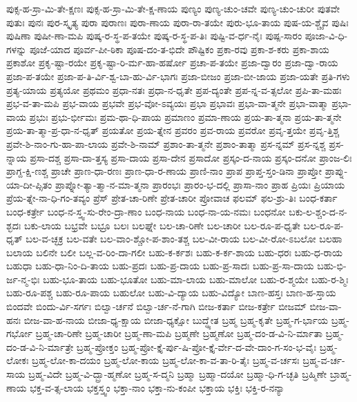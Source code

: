 {ಪುಕ್ಸ-ಹ-ಸ್ರಾ-ಮಿ-ತೇ-ಕ್ಷಣಃ
ಪುಕ್ಸ-ಹ-ಸ್ರಾ-ಮಿ-ತೇ-ಕ್ಷ-ಣಾಯ
ಪುಣ್ಯಂ
ಪುಣ್ಯ-ಚುಂ-ಚವೇ
ಪುಣ್ಯ-ಚುಂ-ಚುರೀ
ಪುತವೇ
ಪುತುಃ
ಪುನಃ
ಪುರ-ಸ್ಕೃತ್ಯ
ಪುರಾ
ಪುರಾಣಃ
ಪುರಾ-ಣಾಯ
ಪುರಾ-ರಾ-ತಯೇ
ಪುರು-ಭೂ-ತಾಯ
ಪುಷ-ಯ-ಶ್ಚೈವ
ಪುಷಿಃ
ಪುಷಿಣಾ
ಪುಷೀ-ಣಾ-ಮಪಿ
ಪುಷ್ಕ-ರ-ಸ್ಥ-ಪ-ತಯೇ
ಪುಷ್ಕ-ರ-ಸ್ಥ-ಪ-ತಿಃ
ಪುಷ್ಟಿ-ವ-ರ್ಧ-ನೈಃ
ಪುಷ್ಪ-ಸಾರಂ
ಪೂಜಾ-ವಿ-ಧಿ-ಗಳನ್ನು
ಪೂಜೆ-ಯಾದ
ಪೂರ್ವ-ಪೀ-ಠಿಕಾ
ಪೂಷ-ದಂ-ತ-ಭಿದೇ
ಪೌಷ್ಟಿಕಂ
ಪ್ರಕಾ-ರವು
ಪ್ರಕಾ-ಶ-ಕರು
ಪ್ರಕಾ-ಶಾಯ
ಪ್ರಕಾಶೋ
ಪ್ರಕೃ-ಷ್ಟಾ-ರಯೇ
ಪ್ರಕೃ-ಷ್ಟಾ-ರಿ-ರ್ಮ-ಹಾ-ಹರ್ಷೋ
ಪ್ರಚಾ-ಪ-ತಯೇ
ಪ್ರಜಾ-ದ್ವಾರಂ
ಪ್ರಜಾ-ದ್ವಾ-ರಾಯ
ಪ್ರಜಾ-ಪ-ತಯೇ
ಪ್ರಜಾ-ಪ-ತಿ-ರ್ವಿ-ಶ್ವ-ಬಾ-ಹು-ರ್ವಿ-ಭಾಗಃ
ಪ್ರಜಾ-ಬೀಜಂ
ಪ್ರಜಾ-ಬೀ-ಜಾಯ
ಪ್ರಜಾ-ಯತೇ
ಪ್ರತಿ-ಗಳು
ಪ್ರತ್ಯ-ಯಾಯ
ಪ್ರತ್ಯಯೋ
ಪ್ರಥಮಂ
ಪ್ರಧಾ-ನತಃ
ಪ್ರಧಾ-ನ-ಧೃತೇ
ಪ್ರಪ-ದ್ಯಂತೇ
ಪ್ರಪ-ನ್ನ-ವ-ತ್ಸಲೋ
ಪ್ರಪಿ-ತಾ-ಮಹಃ
ಪ್ರಭ-ವ-ತಾ-ಮಪಿ
ಪ್ರಭ-ವಾಯ
ಪ್ರಭವೇ
ಪ್ರಭ-ವೋ-ಽವ್ಯಯಃ
ಪ್ರಭಾ
ಪ್ರಭಾವಃ
ಪ್ರಭಾ-ವಾ-ತ್ಮನೇ
ಪ್ರಭಾ-ವಾತ್ಮಾ
ಪ್ರಭಾ-ವಾಯ
ಪ್ರಭುಃ
ಪ್ರಭು-ರ್ಭೀಮಃ
ಪ್ರಮ-ಥಾ-ಧಿ-ಪಾಯ
ಪ್ರಮಾಣಂ
ಪ್ರಮಾ-ಣಾಯ
ಪ್ರಯ-ತಾ-ತ್ಮನಾ
ಪ್ರಯ-ತಾ-ತ್ಮನೇ
ಪ್ರಯ-ತಾ-ತ್ಮಾ-ಪ್ರ-ಧಾ-ನ-ಧೃತ್
ಪ್ರಯತೋ
ಪ್ರಯ-ತ್ನೇನ
ಪ್ರವರಂ
ಪ್ರವ-ರಾಯ
ಪ್ರವರೋ
ಪ್ರವೃ-ತ್ತಯೇ
ಪ್ರವೃ-ತ್ತಿಶ್ಚ
ಪ್ರವೇ-ಶಿ-ನಾಂ-ಗು-ಹಾ-ಪಾ-ಲಾಯ
ಪ್ರವೇ-ಶಿ-ನಾಮ್
ಪ್ರಶಾಂ-ತಾ-ತ್ಮನೇ
ಪ್ರಶಾಂ-ತಾತ್ಮಾ
ಪ್ರಸ-ನ್ನಮ್
ಪ್ರಸ-ನ್ನಶ್ಚ
ಪ್ರಸ-ನ್ನಾಯ
ಪ್ರಸಾ-ದಶ್ಚ
ಪ್ರಸಾ-ದಾ-ತ್ತಸ್ಯ
ಪ್ರಸಾ-ದಾಯ
ಪ್ರಸಾ-ದೇನ
ಪ್ರಸಾದೋ
ಪ್ರಸ್ಕಂ-ದ-ನಾಯ
ಪ್ರಸ್ಕಂ-ದನೋ
ಪ್ರಾಂಜ-ಲಿಃ
ಪ್ರಾಗ್ದ-ಕ್ಷಿ-ಣಶ್ಚ
ಪ್ರಾಚೇ
ಪ್ರಾಣ-ಧಾ-ರಣಃ
ಪ್ರಾಣ-ಧಾ-ರ-ಣಾಯ
ಪ್ರಾಣಿ-ನಾಂ
ಪ್ರಾಪ
ಪ್ರಾಪ್ತ-ಸ್ತಂ-ಡಿನಾ
ಪ್ರಾಪ್ತೋ
ಪ್ರಾಪ್ನು-ಯಾ-ದೀ-ಪ್ಸಿತಂ
ಪ್ರಾಪ್ನೋ-ತ್ಯಾ-ತ್ಮಾ-ನ-ಮಾ-ತ್ಮನಾ
ಪ್ರಾರಂಭಃ
ಪ್ರಾರಂ-ಭ-ದಲ್ಲಿ
ಪ್ರಾಸಾ-ನಾಂ
ಪ್ರಾಹ
ಪ್ರಿಯಃ
ಪ್ರಿಯಾಯ
ಪ್ರೆಯ-ತ್ನೇ-ನಾ-ಧಿ-ಗಂ-ತವ್ಯಂ
ಪ್ರೆಸ್
ಪ್ರೇತ-ಚಾ-ರಿಣೇ
ಪ್ರೇತ-ಚಾರೀ
ಪ್ರೋವಾಚ
ಫಲಮ್
ಫಲ-ಶ್ರು-ತಿಃ
ಬಂಧ-ಕರ್ತಾ
ಬಂಧ-ಕರ್ತ್ರೇ
ಬಂಧ-ನ-ಸ್ತ್ವ-ಸು-ರೇಂ-ದ್ರಾ-ಣಾಂ
ಬಂಧ-ನಾಯ
ಬಂಧ-ನಾ-ಯ-ನಮಃ
ಬಂಧನೋ
ಬಕು-ಲ-ಶ್ಚಂ-ದ-ನ-ಶ್ಛದಃ
ಬಕು-ಲಾಯ
ಬಭ್ರವೇ
ಬಭ್ರೂ
ಬಲಃ
ಬಲಘ್ನೇ
ಬಲ-ಚಾ-ರಿಣೇ
ಬಲ-ಚಾರೀ
ಬಲ-ರೂ-ಪ-ಧೃತೇ
ಬಲ-ರೂ-ಪ-ಧೃತ್
ಬಲ-ವ-ಚ್ಛಕ್ರ
ಬಲ-ವತೇ
ಬಲ-ವಾಂ-ಶ್ಚೋ-ಪ-ಶಾಂ-ತಶ್ಚ
ಬಲ-ವೀ-ರಾಯ
ಬಲ-ವೀ-ರೋ-ಽಬಲೋ
ಬಲಹಾ
ಬಲಾಯ
ಬಲಿನೇ
ಬಲೀ
ಬಲ್ಲ-ವ-ರಿಂ-ದಾ-ಗಲೀ
ಬಹು-ಕ-ರ್ಕಶಃ
ಬಹು-ಕ-ರ್ಕ-ಶಾಯ
ಬಹು-ಧರಃ
ಬಹು-ಧ-ರಾಯ
ಬಹುಧಾ
ಬಹು-ಧಾ-ನಿಂ-ದಿ-ತಾಯ
ಬಹು-ಪ್ರದಃ
ಬಹು-ಪ್ರ-ದಾಯ
ಬಹು-ಪ್ರ-ಸಾದಃ
ಬಹು-ಪ್ರ-ಸಾ-ದಾಯ
ಬಹು-ಭಿ-ರ್ಜ-ನ್ಮ-ಭಿಃ
ಬಹು-ಭೂ-ತಾಯ
ಬಹು-ಭೂತೋ
ಬಹು-ಮಾ-ಲಾಯ
ಬಹು-ಮಾಲೋ
ಬಹು-ರ-ಶ್ಮಯೇ
ಬಹು-ರ-ಶ್ಮಿಃ
ಬಹು-ರೂ-ಪಶ್ಚ
ಬಹು-ರೂ-ಪಾಯ
ಬಹುಲೋ
ಬಹು-ವಿ-ದ್ಯಾಯ
ಬಹು-ವಿದ್ಯೋ
ಬಾಣ-ಹಸ್ತಃ
ಬಾಣ-ಹ-ಸ್ತಾಯ
ಬಿಂದವೇ
ಬಿಂದು-ರ್ವಿ-ಸರ್ಗಃ
ಬಿಲ್ವಾ-ರ್ಚನೆ
ಬಿಲ್ವಾ-ರ್ಚ-ನೆ-ಗಾಗಿ
ಬೀಜ-ಕರ್ತಾ
ಬೀಜ-ಕರ್ತ್ರೇ
ಬೀಜಮ್
ಬೀಜ-ವಾ-ಹನಃ
ಬೀಜ-ವಾ-ಹ-ನಾಯ
ಬೀಜಾ-ಧ್ಯ-ಕ್ಷಾಯ
ಬೀಜಾ-ಧ್ಯಕ್ಷೋ
ಬುದ್ಧ್ಯೇತ
ಬ್ರಹ್ಮ
ಬ್ರಹ್ಮ-ಕೃತೇ
ಬ್ರಹ್ಮ-ಗ-ರ್ಭಾಯ
ಬ್ರಹ್ಮ-ಗರ್ಭೋ
ಬ್ರಹ್ಮ-ಚಾ-ರಿಣೇ
ಬ್ರಹ್ಮ-ಚಾರೀ
ಬ್ರಹ್ಮ-ಣಾ-ಮಪಿ
ಬ್ರಹ್ಮಣೇ
ಬ್ರಹ್ಮಣೋ
ಬ್ರಹ್ಮ-ದಂ-ಡ-ವಿ-ನಿ-ರ್ಮಾತಾ
ಬ್ರಹ್ಮ-ದಂ-ಡ-ವಿ-ನಿ-ರ್ಮಾತ್ರೇ
ಬ್ರಹ್ಮ-ಪ್ರೋಕ್ತಂ
ಬ್ರಹ್ಮ-ಪ್ರೋ-ಕ್ತೈ-ರ್ಪು-ಷಿ-ಪ್ರೋ-ಕ್ತೈ-ರ್ವೇ-ದ-ವೇ-ದಾಂ-ಗ-ಸಂ-ಭ-ವೈಃ
ಬ್ರಹ್ಮ-ಲೋಕಃ
ಬ್ರಹ್ಮ-ಲೋ-ಕಾ-ದಯಂ
ಬ್ರಹ್ಮ-ಲೋ-ಕಾಯ
ಬ್ರಹ್ಮ-ಲೋ-ಕಾ-ವ-ತಾ-ರಿ-ತೈಃ
ಬ್ರಹ್ಮ-ವ-ರ್ಚಸಃ
ಬ್ರಹ್ಮ-ವ-ರ್ಚ-ಸಾಯ
ಬ್ರಹ್ಮ-ವಿದೇ
ಬ್ರಹ್ಮ-ವಿ-ದ್ಬ್ರಾ-ಹ್ಮಣೋ
ಬ್ರಹ್ಮ-ಸ-ದ್ಮನಿ
ಬ್ರಹ್ಮಾ
ಬ್ರಹ್ಮಾ-ದಯೋ
ಬ್ರಹ್ಮಾ-ಧಿ-ಗ-ಚ್ಛತಿ
ಬ್ರಹ್ಮಿಣೇ
ಬ್ರಾಹ್ಮ-ಣಾಯ
ಭಕ್ತ-ವ-ತ್ಸ-ಲಾಯ
ಭಕ್ತಸ್ತ್ವಂ
ಭಕ್ತಾ-ನಾಂ
ಭಕ್ತಾ-ನು-ಕಂಪೀ
ಭಕ್ತಾಯ
ಭಕ್ತಿಃ
ಭಕ್ತಿ-ರ-ನನ್ಯಾ
}
